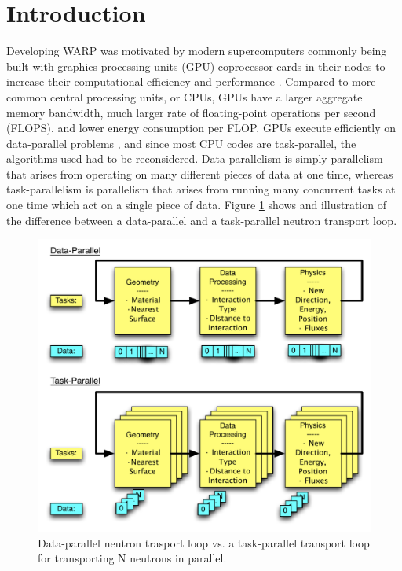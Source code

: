 \documentclass[preprint,12pt]{elsarticle}
\begin{document}
\linenumbers


\section{Introduction}
\label{sec:intro}

Developing WARP was motivated by modern supercomputers commonly being built with graphics processing units (GPU) coprocessor cards in their nodes to increase their computational efficiency and performance \cite{}.  Compared to more common central processing units, or CPUs, GPUs have a larger aggregate memory bandwidth, much larger rate of floating-point operations per second (FLOPS), and lower energy consumption per FLOP\cite{}.  GPUs execute efficiently on data-parallel problems \cite{}, and since most CPU codes are task-parallel, the algorithms used had to be reconsidered.  Data-parallelism is simply parallelism that arises from operating on many different pieces of data at one time, whereas task-parallelism is parallelism that arises from running many concurrent tasks at one time which act on a single piece of data.   Figure \ref{datavtask} shows and illustration of the difference between a data-parallel and a task-parallel neutron transport loop.

\begin{figure}[h!] 
  \centering
    \includegraphics[width=\textwidth]{graphics/datavtask.pdf}
     \caption{Data-parallel neutron trasport loop vs. a task-parallel transport loop for transporting N neutrons in parallel.  \label{datavtask} }
\end{figure}
\end{document}
